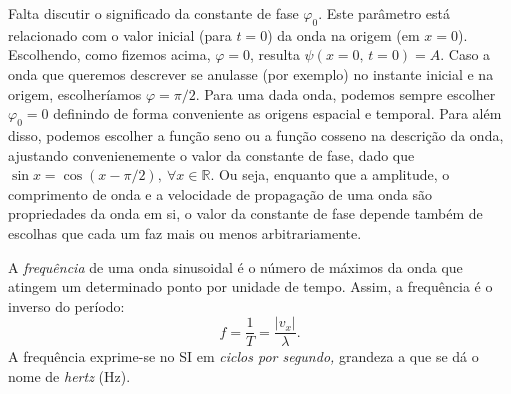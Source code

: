 Falta discutir o significado da constante de fase $\varphi_0$. Este parâmetro está
relacionado com o valor inicial (para $t=0$) da onda na origem (em $x=0$).
Escolhendo, como fizemos acima, $\varphi=0$, resulta $\psi(x=0,\,t=0)=A$. Caso a onda
que queremos descrever se anulasse (por exemplo) no instante inicial e na
origem, escolheríamos $\varphi=\pi/2$. Para uma dada onda, podemos sempre escolher
$\varphi_0=0$ definindo de forma conveniente as origens espacial e temporal. Para
além disso, podemos escolher a função seno ou a função cosseno na descrição da
onda, ajustando convenienemente o valor da constante de fase, dado que $\sin
x=\cos(x-\pi/2),\ \forall x\in \mathbb{R}$. Ou seja, enquanto que a amplitude, o
comprimento de onda e a velocidade de propagação de uma onda são propriedades da
onda em si, o valor da constante de fase depende também de escolhas que cada um
faz mais ou menos arbitrariamente.
 
A \emph{frequência} de uma onda sinusoidal é o número de máximos da onda que
atingem um determinado ponto por unidade de tempo. Assim, a frequência é o
inverso do período:
\begin{equation*}
    f=\frac{1}{T}=\frac{|v_x|}{\lambda}.
\end{equation*}
A frequência exprime-se no SI em \emph{ciclos por segundo,} grandeza a que se dá
o nome de \emph{hertz} (Hz).

